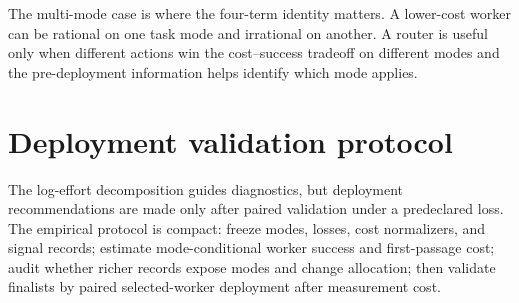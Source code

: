 \documentclass{article}
\begin{document}
The multi-mode case is where the four-term identity matters.
A lower-cost worker can be rational on one task mode and irrational on another.
A router is useful only when different actions win the cost--success tradeoff on different modes and the pre-deployment information helps identify which mode applies.

\section{Deployment validation protocol}
\label{sec:selection}


The log-effort decomposition guides diagnostics, but deployment recommendations are made only after paired validation under a predeclared loss.
The empirical protocol is compact: freeze modes, losses, cost normalizers, and signal records; estimate mode-conditional worker success and first-passage cost; audit whether richer records expose modes and change allocation; then validate finalists by paired selected-worker deployment after measurement cost.
\end{document}
